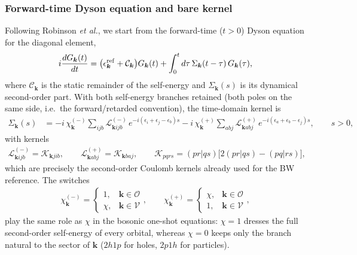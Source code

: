 \subsubsection{Forward-time Dyson equation and bare kernel}
Following Robinson \emph{et al.}, we start from the forward-time ($t>0$) Dyson equation for the diagonal element,
\begin{align}
i\frac{dG_{\bm{k}}(t)}{dt}
=
\big(\epsilon_{\bm{k}}^{\rm ref}+\mathcal{C}_{\bm{k}}\big)G_{\bm{k}}(t)
+\int_0^t d\tau\,\Sigma_{\bm{k}}(t-\tau)\,G_{\bm{k}}(\tau),
\label{eq:dyson}
\end{align}
where $\mathcal{C}_{\bm{k}}$ is the static remainder of the self-energy and $\Sigma_{\bm{k}}(s)$ is its dynamical second-order part. With both self-energy branches retained (both poles on the same side, i.e.\ the forward/retarded convention), the time-domain kernel is
\begin{align}
\Sigma_{\bm{k}}(s)
&=
-i\,\chi_{\bm{k}}^{(-)}\sum_{ijb}\mathcal{L}^{(-)}_{\bm{k}ijb}\,
e^{-i(\epsilon_i+\epsilon_j-\epsilon_b)s}
-i\,\chi_{\bm{k}}^{(+)}\sum_{abj}\mathcal{L}^{(+)}_{\bm{k}abj}\,
e^{-i(\epsilon_a+\epsilon_b-\epsilon_j)s},
\qquad s>0,
\label{eq:Sigma2}
\end{align}
with kernels
\begin{align}
\mathcal{L}^{(-)}_{\bm{k}ijb}=\mathcal{K}_{\bm{k}jib},
\qquad
\mathcal{L}^{(+)}_{\bm{k}abj}=\mathcal{K}_{\bm{k}baj},
\qquad
\mathcal{K}_{pqrs}=(pr|qs)\big[2(pr|qs)-(pq|rs)\big],
\label{eq:Lkernels}
\end{align}
which are precisely the second-order Coulomb kernels already used for the BW reference. The switches
\begin{align}
\chi^{(-)}_{\bm{k}}=\begin{cases}1,&\bm{k}\in\mathcal{O}\\ \chi,&\bm{k}\in\mathcal{V}\end{cases},
\qquad
\chi^{(+)}_{\bm{k}}=\begin{cases}\chi,&\bm{k}\in\mathcal{O}\\ 1,&\bm{k}\in\mathcal{V}\end{cases},
\end{align}
play the same role as $\chi$ in the bosonic one-shot equations: $\chi=1$ dresses the full second-order self-energy of every orbital, whereas $\chi=0$ keeps only the branch natural to the sector of $\bm{k}$ ($2h1p$ for holes, $2p1h$ for particles).

